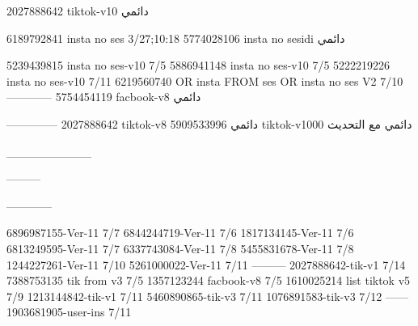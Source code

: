 2027888642 tiktok-v10
دائمي

6189792841 insta no ses
3/27;10:18
5774028106 insta no sesidi
دائمي

5239439815 insta no ses-v10
7/5
5886941148 insta no ses-v10
7/5
5222219226 insta no ses-v10
7/11
6219560740 OR insta FROM ses OR insta no ses V2
7/10
------------
5754454119 facbook-v8
دائمي


--------------
2027888642 tiktok-v8
دائمي
5909533996 tiktok-v1000
دائمي مع التحديث

__________

---------

------------

6896987155-Ver-11
7/7
6844244719-Ver-11
7/6
1817134145-Ver-11
7/6
6813249595-Ver-11
7/7
6337743084-Ver-11
7/8
5455831678-Ver-11
7/8
1244227261-Ver-11
7/10
5261000022-Ver-11
7/11
---------
2027888642-tik-v1
7/14
7388753135 tik from v3
7/5
1357123244 facbook-v8
7/5
1610025214 list tiktok v5
7/9
1213144842-tik-v1
7/11
5460890865-tik-v3
7/11
1076891583-tik-v3
7/12
------
1903681905-user-ins
7/11
